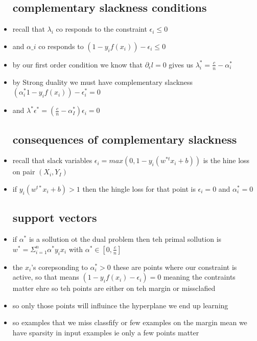 \documentclass{article}
\begin{document}
\begin{itemize}
\subsection{complementary slackness conditions}
\item recall that $\lambda_{i}$ co responds to the constraint $\epsilon_{i}\leq 0$
\item and $\alpha\_{i}$ co responds to $(1-y_if(x_i))-\epsilon_{i}\leq 0$
\item by our first order condition we know that $\partial_{\epsilon}l=0$ gives us $\lambda_{i}^{*}=\frac{c}{n}-\alpha_{i}^{*}$
\item by Strong duality we must have complementary slackness $(\alpha_{i}^{*}1-y_if(x_i))-\epsilon_{i}^{*}= 0$
\item and $\lambda^{*}\epsilon^{*}=(\frac{c}{n}-\alpha_{I}^*)\epsilon_{i}=0$
\subsection{consequences of complementary slackness }
\item recall that slack variables $\epsilon_{i}=max(0,1-y_i(w^{*t}x_i+b))$ is the hine loss on pair $(X_i,Y_I)$
\item if $y_i(w^{t*}x_i+b)>1$ then the hingle loss for that point is $\epsilon_{i}=0$ and $\alpha_{i}^{*}=0$
\subsection{support vectors}
\item if $\alpha^{*}$ is a sollution ot the dual problem then teh primal sollution is $w^{*}=\Sigma_{i=1}^{n}\alpha^{*}y_ix_i$ with $\alpha^{*}\in [0,\frac{c}{n}]$
\item the $x_i$'s corepsonding to $\alpha_{i}^{*}>0$ these are points where our constraint is active, so that means $(1-y_if(x_i)-\epsilon_{i})=0$ meaning the contraints matter ehre so teh points are either on teh margin or missclafied 
\item so only those points will influince the hyperplane we end up learning 
\item so examples that we miss classfify or few examples on the margin mean we have sparsity in input examples ie only a few points matter 
\end{itemize}
\end{document}
